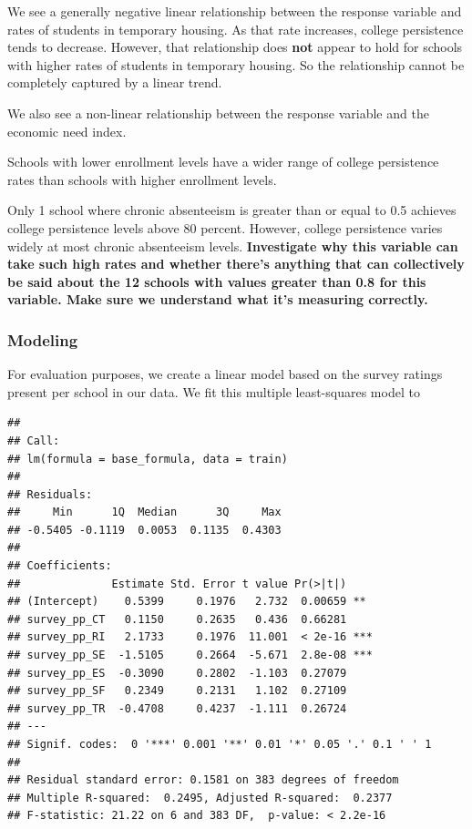\documentclass[
  man,floatsintext]{apa6}
\begin{document}
We see a generally negative linear relationship between the response variable and rates of students in temporary housing. As that rate increases, college persistence tends to decrease. However, that relationship does \textbf{not} appear to hold for schools with higher rates of students in temporary housing. So the relationship cannot be completely captured by a linear trend.

We also see a non-linear relationship between the response variable and the economic need index.

Schools with lower enrollment levels have a wider range of college persistence rates than schools with higher enrollment levels.

Only 1 school where chronic absenteeism is greater than or equal to 0.5 achieves college persistence levels above 80 percent. However, college persistence varies widely at most chronic absenteeism levels. \textbf{Investigate why this variable can take such high rates and whether there's anything that can collectively be said about the 12 schools with values greater than 0.8 for this variable. Make sure we understand what it's measuring correctly.}

\hypertarget{modeling}{%
\subsubsection{Modeling}\label{modeling}}

For evaluation purposes, we create a linear model based on the survey ratings present per school in our data. We fit this multiple least-squares model to

\begin{verbatim}
## 
## Call:
## lm(formula = base_formula, data = train)
## 
## Residuals:
##     Min      1Q  Median      3Q     Max 
## -0.5405 -0.1119  0.0053  0.1135  0.4303 
## 
## Coefficients:
##              Estimate Std. Error t value Pr(>|t|)    
## (Intercept)    0.5399     0.1976   2.732  0.00659 ** 
## survey_pp_CT   0.1150     0.2635   0.436  0.66281    
## survey_pp_RI   2.1733     0.1976  11.001  < 2e-16 ***
## survey_pp_SE  -1.5105     0.2664  -5.671  2.8e-08 ***
## survey_pp_ES  -0.3090     0.2802  -1.103  0.27079    
## survey_pp_SF   0.2349     0.2131   1.102  0.27109    
## survey_pp_TR  -0.4708     0.4237  -1.111  0.26724    
## ---
## Signif. codes:  0 '***' 0.001 '**' 0.01 '*' 0.05 '.' 0.1 ' ' 1
## 
## Residual standard error: 0.1581 on 383 degrees of freedom
## Multiple R-squared:  0.2495, Adjusted R-squared:  0.2377 
## F-statistic: 21.22 on 6 and 383 DF,  p-value: < 2.2e-16
\end{verbatim}
\end{document}

